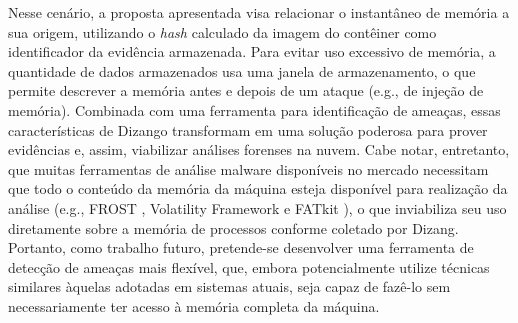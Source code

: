 \documentclass[conference]{IEEEtran}
\newcommand{\marcosR}[1]{{\color{brown}{COMMENT: #1}}}
\newcommand{\fancyname}{Dizang}
\begin{document}
Nesse cenário, a proposta apresentada visa relacionar o instantâneo de memória a sua origem, utilizando o \textit{hash} calculado da imagem do contêiner como identificador da evidência armazenada.
%
Para evitar uso excessivo de memória, a quantidade de dados armazenados usa uma janela de armazenamento, o que permite descrever a memória antes e depois de um ataque (e.g., de injeção de memória). 
%
Combinada com uma ferramenta para identificação de ameaças, essas características de \fancyname o transformam em uma solução poderosa para prover evidências e, assim, viabilizar análises forenses na nuvem.
%
Cabe notar, entretanto, que muitas ferramentas de análise malware disponíveis no mercado necessitam que todo o conteúdo da memória da máquina esteja disponível para realização da análise (e.g., FROST \cite{Dykstra_FROST:2013}, Volatility Framework \cite{VolatilityFoundation2014} e FATkit \cite{Fraser2006}), o que inviabiliza seu uso diretamente sobre a memória de processos conforme coletado por \fancyname.
%
Portanto, como trabalho futuro, pretende-se desenvolver uma ferramenta de detecção de ameaças mais flexível, que, embora potencialmente utilize técnicas similares àquelas adotadas em sistemas atuais, seja capaz de fazê-lo sem necessariamente ter acesso à memória completa da máquina.



%
%
%






\end{document}
